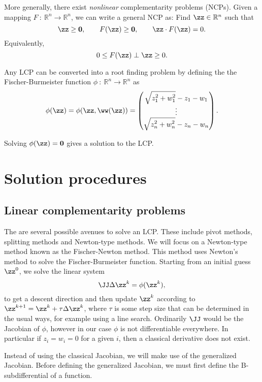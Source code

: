 More generally, there exist \emph{nonlinear} complementarity problems (NCPs). Given a mapping $F~:~\mathbb{R}^n\to\mathbb{R}^n$, we can write a general NCP as: Find $\zz\in \mathbb{R}^n$ such that
\begin{equation} \label{eq:ncp}\zz \geq \mathbf{0}, \qquad F(\zz) \geq  \mathbf{0}, \qquad \zz\cdot F(\zz) = 0.\end{equation}
Equivalently,
\[ 0 \leq F(\zz) \perp \zz\geq 0.\]
 
Any LCP can be converted into a root finding problem by defining the the Fischer-Burmeister function $\phi~:~\mathbb{R}^n\to\mathbb{R}^n$ as 
\begin{equation}\label{eq:fischer} \phi(\zz) = \phi(\zz,\ww(\zz)) = \begin{pmatrix} \sqrt{\displaystyle z_1^2 + w_1^2} - z_1 - w_1\\ \vdots \\ \sqrt{\displaystyle z_n^2 + w_n^2} - z_n - w_n\end{pmatrix}.\end{equation}

Solving  $\phi(\zz) = \mathbf{0}$ gives a solution to the LCP. 

\section{Solution procedures}

\subsection{Linear complementarity problems}

The are several possible avenues to solve an LCP. These include pivot methods, splitting methods and Newton-type methods. We will focus on a Newton-type method known as the Fischer-Newton method. This method uses Newton's method to solve the Fischer-Burmeister function. Starting from an initial guess $\zz^0$, we solve the linear system
\[ \JJ\Delta \zz^k = \phi(\zz^k),\]
to get a descent direction and then update $\zz^k$ according to $\zz^{k+1} = \zz^k + \tau\Delta\zz^k$, where $\tau$ is some step size that can be determined in the usual ways, for example using a line search. Ordinarily $\JJ$ would be the Jacobian of $\phi$, however in our case $\phi$ is not differentiable everywhere. In particular if $z_i = w_i = 0$ for a given $i$, then a classical derivative does not exist.  

Instead of using the classical Jacobian, we will make use of the generalized Jacobian. Before defining the generalized Jacobian, we must first define the B-subdifferential of a function. 

